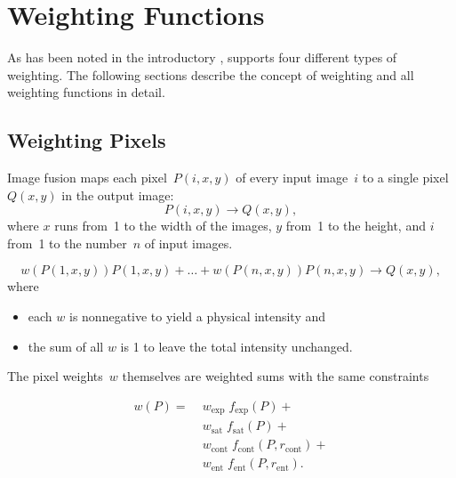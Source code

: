 

\chapter[Weighting Functions]{\label{sec:weighting-functions}%
  Weighting Functions}

As has been noted in the introductory , \App{} supports
four different types of weighting.  The following sections describe the concept of weighting and
all weighting functions in detail.


\section[Weighting Pixels]{\label{sec:weighting-pixels}%
  Weighting Pixels}

Image fusion maps each pixel~$P(i, x, y)$ of every input image~$i$ to a single pixel~$Q(x, y)$
in the output image:
\[
    P(i, x, y) \rightarrow Q(x, y),
\]
\noindent where $x$ runs from~1 to the width of the images, $y$ from~1 to the height, and $i$
from~1 to the number~$n$ of input images.

\begin{equation}
  \label{equ:weight}
  w(P(1, x, y)) P(1, x, y) + \ldots + w(P(n, x, y)) P(n, x, y)
  \rightarrow
  Q(x, y),
\end{equation}
\noindent where

\begin{itemize}
\item
  each $w$ is nonnegative to yield a physical intensity and

\item
  the sum of all $w$ is 1 to leave the total intensity unchanged.
\end{itemize}

\noindent The pixel weights~$w$ themselves are weighted sums with the same constraints

\begin{align*}
    w(P) = \;
    & w_{\mathrm{exp}} \; f_{\mathrm{exp}}(P) + \\
    & w_{\mathrm{sat}} \; f_{\mathrm{sat}}(P) + \\
    & w_{\mathrm{cont}} \; f_{\mathrm{cont}}(P, r_{\mathrm{cont}}) + \\
    & w_{\mathrm{ent}} \; f_{\mathrm{ent}}(P, r_{\mathrm{ent}}).
\end{align*}

